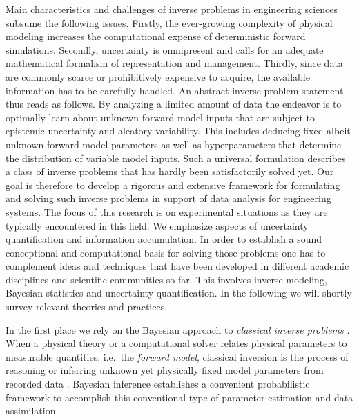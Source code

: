 Main characteristics and challenges of inverse problems in engineering sciences subsume the following issues.
Firstly, the ever-growing complexity of physical modeling increases the computational expense of deterministic forward simulations.
Secondly, uncertainty is omnipresent and calls for an adequate mathematical formalism of representation and management.
Thirdly, since data are commonly scarce or prohibitively expensive to acquire, the available information has to be carefully handled.
An abstract inverse problem statement thus reads as follows.
By analyzing a limited amount of data the endeavor is to optimally learn about unknown forward model inputs that are subject to epistemic uncertainty and aleatory variability.
This includes deducing fixed albeit unknown forward model parameters as well as hyperparameters that determine the distribution of variable model inputs.
Such a universal formulation describes a class of inverse problems that has hardly been satisfactorily solved yet.
Our goal is therefore to develop a rigorous and extensive framework for formulating and solving such inverse problems in support of data analysis for engineering systems.
The focus of this research is on experimental situations as they are typically encountered in this field.
We emphasize aspects of uncertainty quantification and information accumulation.
In order to establish a sound conceptional and computational basis for solving those problems one has to complement ideas and techniques that have been developed in different academic disciplines and scientific communities so far.
This involves inverse modeling, Bayesian statistics and uncertainty quantification.
In the following we will shortly survey relevant theories and practices.
\par %
In the first place we rely on the Bayesian approach to \textit{classical inverse problems} \cite{Bayesian:Stuart2010,Bayesian:Allmaras2013}.
When a physical theory or a computational solver relates physical parameters to measurable quantities, i.e.\ the \textit{forward model},
classical inversion is the process of reasoning or inferring unknown yet physically fixed model parameters from recorded data \cite{Inversion:Tarantola2005,Inversion:Kaipio2005}.
Bayesian inference establishes a convenient probabilistic framework to accomplish this conventional type of parameter estimation and data assimilation.
